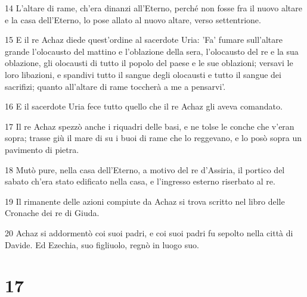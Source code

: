 \par 14 L'altare di rame, ch'era dinanzi all'Eterno, perché non fosse fra il nuovo altare e la casa dell'Eterno, lo pose allato al nuovo altare, verso settentrione.
\par 15 E il re Achaz diede quest'ordine al sacerdote Uria: 'Fa' fumare sull'altare grande l'olocausto del mattino e l'oblazione della sera, l'olocausto del re e la sua oblazione, gli olocausti di tutto il popolo del paese e le sue oblazioni; versavi le loro libazioni, e spandivi tutto il sangue degli olocausti e tutto il sangue dei sacrifizi; quanto all'altare di rame toccherà a me a pensarvi'.
\par 16 E il sacerdote Uria fece tutto quello che il re Achaz gli aveva comandato.
\par 17 Il re Achaz spezzò anche i riquadri delle basi, e ne tolse le conche che v'eran sopra; trasse giù il mare di su i buoi di rame che lo reggevano, e lo posò sopra un pavimento di pietra.
\par 18 Mutò pure, nella casa dell'Eterno, a motivo del re d'Assiria, il portico del sabato ch'era stato edificato nella casa, e l'ingresso esterno riserbato al re.
\par 19 Il rimanente delle azioni compiute da Achaz si trova scritto nel libro delle Cronache dei re di Giuda.
\par 20 Achaz si addormentò coi suoi padri, e coi suoi padri fu sepolto nella città di Davide. Ed Ezechia, suo figliuolo, regnò in luogo suo.

\chapter{17}

